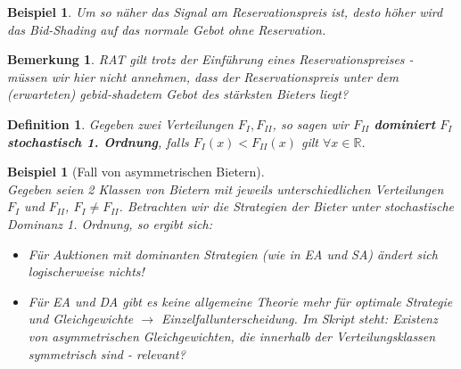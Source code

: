 \documentclass[12pt]{extreport} %
\newcommand{\R}{\mathbb{R}}
\theoremstyle{named}
\theoremstyle{nnamed}
\theoremstyle{itshape}
\newtheorem*{definition}{Definition}
\theoremstyle{normal}
\newtheorem{beispiel}[unnamedtheorem]{Beispiel}
\newtheorem*{bemerkung}{Bemerkung}
\begin{document}
\begin{beispiel}
	Um so näher das Signal am Reservationspreis ist, desto höher wird das Bid-Shading auf das normale Gebot ohne Reservation.
\end{beispiel}

\begin{bemerkung}
	RAT gilt trotz der Einführung eines Reservationspreises - \textit{ müssen wir hier nicht annehmen, dass der Reservationspreis unter dem (erwarteten) gebid-shadetem Gebot des stärksten Bieters liegt?}
\end{bemerkung}

\begin{definition}
	Gegeben zwei Verteilungen $F_{I}, F_{II}$, so sagen wir $F_{II}$ \textbf{dominiert} $F_{I}$ \textbf{stochastisch 1. Ordnung}, falls $F_{I}(x) < F_{II}(x)$ gilt $\forall x \in \R$.
\end{definition}

\begin{beispiel}[Fall von asymmetrischen Bietern] ~\\
	Gegeben seien 2 Klassen von Bietern mit jeweils unterschiedlichen Verteilungen $F_{I}$ und $F_{II}$, $F_{I} \neq F_{II}$. Betrachten wir die Strategien der Bieter unter stochastische Dominanz 1. Ordnung, so ergibt sich:
	\begin{itemize}
		\item Für Auktionen mit dominanten Strategien (wie in EA und SA) ändert sich logischerweise nichts! 
		\item Für EA und DA gibt es keine allgemeine Theorie mehr für optimale Strategie und Gleichgewichte $\rightarrow$ Einzelfallunterscheidung. \textit{Im Skript steht: Existenz von asymmetrischen Gleichgewichten, die innerhalb der Verteilungsklassen symmetrisch sind - relevant?}
	\end{itemize}	
\end{beispiel}
\end{document}
